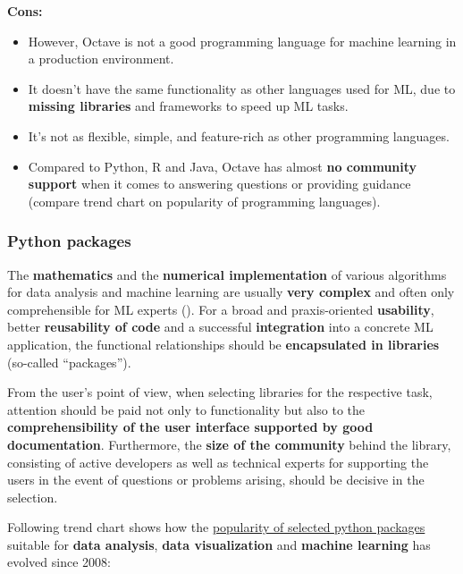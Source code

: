 \documentclass [oneside,10pt,a4paper,ngerman,BCOR10mm,headsepline,parindent,final]{scrartcl}
\providecommand{\tightlist}{%
      \setlength{\itemsep}{0pt}\setlength{\parskip}{0pt}}
\begin{document}
\textbf{Cons:}

\begin{itemize}
\tightlist
\item
  However, Octave is not a good programming language for machine
  learning in a production environment.
\item
  It doesn't have the same functionality as other languages used for ML,
  due to \textbf{missing libraries} and frameworks to speed up ML tasks.
\item
  It's not as flexible, simple, and feature-rich as other programming
  languages.
\item
  Compared to Python, R and Java, Octave has almost \textbf{no community
  support} when it comes to answering questions or providing guidance
  (compare trend chart on popularity of programming languages).
\end{itemize}

    \hypertarget{python-packages}{%
\subsubsection{Python packages}\label{python-packages}}

The \textbf{mathematics} and the \textbf{numerical implementation} of
various algorithms for data analysis and machine learning are usually
\textbf{very complex} and often only comprehensible for ML experts
(\cite{ML_bestLanguage_2021}). For a broad and praxis-oriented
\textbf{usability}, better \textbf{reusability of code} and a successful
\textbf{integration} into a concrete ML application, the functional
relationships should be \textbf{encapsulated in libraries} (so-called
``packages'').

From the user's point of view, when selecting libraries for the
respective task, attention should be paid not only to functionality but
also to the \textbf{comprehensibility of the user interface supported by
good documentation}. Furthermore, the \textbf{size of the community}
behind the library, consisting of active developers as well as technical
experts for supporting the users in the event of questions or problems
arising, should be decisive in the selection.

Following trend chart shows how the
\href{https://insights.stackoverflow.com/trends?tags=pandas\%2Cnumpy\%2Cmatplotlib\%2Cseaborn\%2Cscikit-learn\%2Ctensorflow\%2Ckeras\%2Cpytorch}{popularity
of selected python packages} suitable for \textbf{data analysis},
\textbf{data visualization} and \textbf{machine learning} has evolved
since 2008:
\end{document}
